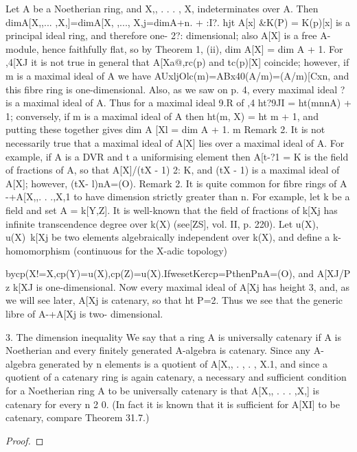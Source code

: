 \begin{theorem}[Theorem 15.4]\label{mcrt-auto-theorem-15-4}
\begin{mathematicalrecord}
Let A be a Noetherian        ring, and X,, . . . , X, indeterminates
     over A. Then
              dimA[X,,...      ,X,]=dimA[X,         ,..., X,j=dimA+n.
  + %
:I?. hjt A[x]    &K(P)    = K(p)[x]    is a principal ideal ring, and therefore one-
2?:
dimensional; also A[X] is a free A-module, hence faithfully flat, so by
Theorem 1, (ii), dim A[X] = dim A + 1.
   For ,4[XJ it is not true in general that A[Xa@,rc(p)    and tc(p)[X]
coincide; however, if m is a maximal ideal of A we have
         AUxljOlc(m)=ABx40(A/m)=(A/m)[Cxn,
and this fibre ring is one-dimensional.    Also, as we saw on p. 4, every
maximal ideal ?%
is a maximal ideal of A. Thus for a maximal ideal 9.R of ,4%
         ht?9JI = ht(mnnA) + 1;
conversely, if m is a maximal ideal of A then ht(m, X) = ht m + 1, and
putting these together gives dim A [Xl = dim A + 1. m
Remark 2. It is not necessarily true that a maximal     ideal of A[X] lies
over a maximal ideal of A. For example, if A is a DVR and t a
uniformising element then A[t-?1 = K is the field of fractions of A, so
that A[X]/(tX - 1) 2: K, and (tX - 1) is a maximal ideal of A[X]; however,
(tX- l)nA=(O).
Remark 2. It is quite common         for fibre rings of A -+A[X,,.    . .,X,1
to have dimension strictly greater than n. For example, let k be a field and
set A = k[Y,Z]. It is well-known that the field of fractions of k[Xj has
infinite transcendence degree over k(X) (see[ZS], vol. II, p. 220). Let u(X),
u(X)~k[Xj      be two elements algebraically independent over k(X), and
define a k-homomorphism      (continuous for the X-adic topology)


bycp(X!=X,cp(Y)=u(X),cp(Z)=u(X).IfwesetKercp=PthenPnA=(O),
and A[XJ/P z k[XJ is one-dimensional.         Now every maximal ideal of
A[Xj has height 3, and, as we will see later, A[Xj is catenary, so that
ht P=2. Thus we see that the generic libre of A-+A[Xj            is two-
dimensional.

3. The dimension inequality
We say that a ring A is universally catenary if A is Noetherian and every
finitely generated A-algebra is catenary. Since any A-algebra generated
by n elements is a quotient of A[X,, . , . , X.1, and since a quotient of a
catenary ring is again catenary, a necessary and sufficient condition for a
Noetherian ring A to be universally catenary is that A[X,, . . . ,X,] is
catenary for every n 2 0. (In fact it is known that it is sufficient for A[XI]
to be catenary, compare Theorem 31.7.)
\end{mathematicalrecord}
\end{theorem}
\begin{proof}
\notready
\end{proof}


